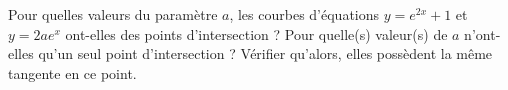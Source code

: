 \begin{exercice}\label{exoJanvier013}

Pour quelles valeurs du paramètre $a$, les courbes d'équations $y= e^{2x}+1$ et $y=2a e^{x}$ ont-elles des points d'intersection ? Pour quelle(s) valeur(s) de $a$ n'ont-elles qu'un seul point d'intersection ? Vérifier qu'alors, elles possèdent la même tangente en ce point.

\end{exercice}
